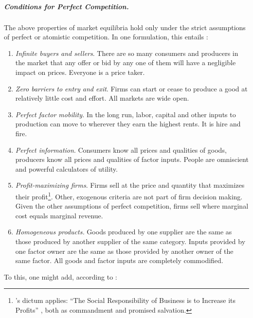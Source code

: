 \subparagraph[Perfect Competition]{Conditions for Perfect Competition.}  \label{sec:perfect-competition} The above properties of market equilibria hold only under the strict assumptions of perfect or atomistic competition. In one formulation, this entails \citep[157f]{McDowell2006}:
\begin{enumerate}
	\item \emph{Infinite buyers and sellers}.\label{it:infinite-buyers-sellers} There are so many consumers and producers in the market that any offer or bid by any one of them will have a negligible impact on prices. Everyone is a price taker.
	\item \emph{Zero barriers to entry and exit}. \label{it:easy-entry-exit}
		Firms can start or cease to produce a good at relatively little cost and effort. All markets are wide open.
	\item \emph{Perfect factor mobility.} \label{it:perfect-factor-mobility}
		In the long run, labor, capital and other inputs to production can move to wherever they earn the highest rents. It is hire and fire.
	\item \emph{Perfect information}. \label{it:perfect-information}
		Consumers know all prices and qualities of goods, producers know all prices and qualities of factor inputs. People are omniscient and powerful calculators of utility.
	\item \emph{Profit-maximizing firms}. \label{it:profit-maximizing-firms}
		Firms sell at the price and quantity that maximizes their profit\footnote{
			\citeauthor{Friedman1970a}'s dictum applies: ``The Social Responsibility of Business is to Increase its Profits'' \citeyearpar{Friedman1970a}, both as commandment and promised salvation.}.
		Other, exogenous criteria are not part of firm decision making. Given the other assumptions of perfect competition, firms sell where marginal cost equals marginal revenue.
	\item \emph{Homogeneous products.}\label{it:homogeneous-products}
		Goods produced by one supplier are the same as those produced by another supplier of the same category. Inputs provided by one factor owner are the same as those provided by another owner of the same factor. All goods and factor inputs are completely commodified.
\end{enumerate}
To this, one might add, according to \citeauthor{Wikipedia2012}:
